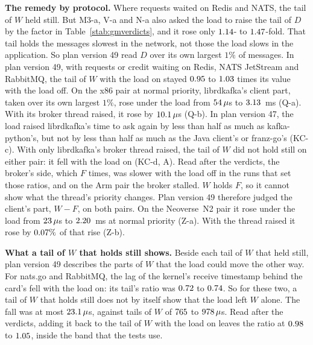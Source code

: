 \documentclass[10pt,journal,onecolumn]{IEEEtran}
\newcommand{\redis}{Redis}
\begin{document}
\textbf{The remedy by protocol.} Where requests waited on \redis{} and NATS, the tail of $W$ held
still. But M3-a, V-a and N-a also asked the load to raise the tail of $D$ by the factor in
Table~\ref{stab:gmverdicts}, and it rose only $1.14$- to $1.47$-fold. That tail
holds the messages slowest in the network, not those the load slows in the application. So plan
version 49 read $D$ over its own largest $1\%$ of messages. In plan version 49, with requests or credit waiting on \redis{}, NATS JetStream and RabbitMQ, the tail
of $W$ with the load on stayed $0.95$ to $1.03$ times its value with the load off.
On the x86 pair at normal priority, librdkafka's client part, taken over its own largest $1\%$, rose
under the load from $54\,\mu$s to $3.13$~ms (Q-a). With its broker thread raised, it rose
by $10.1\,\mu$s (Q-b). In plan version 47, the load raised
librdkafka's time to ask again by less than half as much as kafka-python's, but not by less than
half as much as the Java client's or franz-go's (KC-c). With only librdkafka's broker thread
raised, the tail of $W$ did not hold still on either pair: it fell with the load on (KC-d, A).
Read after the verdicts, the broker's side, which $F$ times, was slower with the load off in the
runs that set those ratios, and on the Arm pair the broker stalled. $W$ holds $F$, so it cannot
show what the thread's priority changes. Plan version 49 therefore judged the client's part,
$W - F$, on both pairs. On the Neoverse~N2 pair it rose under the load from $23\,\mu$s to
$2.20$~ms at normal priority (Z-a). With the thread raised it rose by $0.07\%$ of
that rise (Z-b).

\textbf{What a tail of $W$ that holds still shows.} Beside each tail of $W$ that held still, plan
version 49 describes the parts of $W$ that the load could move the other way. For nats.go and
RabbitMQ, the lag of the kernel's receive timestamp behind the card's fell with the load on: its
tail's ratio was $0.72$ to $0.74$. So for these two, a tail of $W$ that holds still does
not by itself show that the load left $W$ alone. The fall was at most $23.1\,\mu$s,
against tails of $W$ of $765$ to $978\,\mu$s. Read after the verdicts, adding it
back to the tail of $W$ with the load on leaves the ratio at $0.98$ to $1.05$, inside
the band that the tests use.



\end{document}
